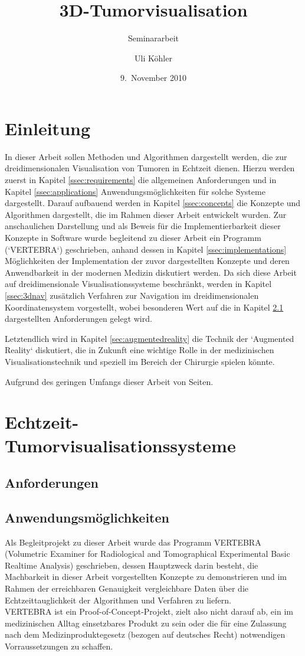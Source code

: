 \documentclass[a4paper]{scrartcl}
\title{3D-Tumorvisualisation}
\subtitle{Seminararbeit}
\author{Uli Köhler}
\date{9.~November 2010}
\begin{document}
\maketitle
\tableofcontents \newpage
\section{Einleitung}\label{sec:introduction}
In dieser Arbeit sollen Methoden und Algorithmen dargestellt werden, die zur dreidimensionalen Visualisation von Tumoren in Echtzeit dienen. Hierzu werden zuerst in Kapitel \vref{ssec:requirements} die allgemeinen Anforderungen und in Kapitel \vref{ssec:applications}
Anwendungsmöglichkeiten für solche Systeme dargestellt. Darauf aufbauend werden in Kapitel \vref{ssec:concepts} die Konzepte und Algorithmen dargestellt, die im Rahmen dieser Arbeit entwickelt wurden. Zur anschaulichen Darstellung und als Beweis für die Implementierbarkeit dieser Konzepte in Software wurde begleitend zu dieser Arbeit ein Programm (`VERTEBRA`) geschrieben, anhand dessen in Kapitel \vref{ssec:implementations} Möglichkeiten der Implementation der zuvor dargestellten Konzepte und deren Anwendbarkeit in der modernen Medizin diskutiert werden. Da sich diese Arbeit auf dreidimensionale Visualisationssysteme beschränkt, werden in Kapitel \vref{ssec:3dnav} zusätzlich Verfahren zur Navigation im dreidimensionalen Koordinatensystem vorgestellt, wobei besonderen Wert auf die in Kapitel \ref{ssec:requirements} dargestellten Anforderungen gelegt wird.

Letztendlich wird in Kapitel \vref{sec:augmentedreality} die Technik der `Augmented Reality` diskutiert, die in Zukunft eine wichtige Rolle in der medizinischen Visualisationstechnik und speziell im Bereich der Chirurgie spielen könnte.

Aufgrund des geringen Umfangs dieser Arbeit von \pageref{appendixstart} Seiten.
\section{Echtzeit-Tumorvisualisationssysteme}\label{sec:vissystems}
\subsection{Anforderungen}\label{ssec:requirements}
\subsection{Anwendungsmöglichkeiten}\label{ssec:applications}
Als Begleitprojekt zu dieser Arbeit wurde das Programm VERTEBRA
(Volumetric Examiner for Radiological and Tomographical Experimental Basic Realtime Analysis) geschrieben, dessen Hauptzweck
darin besteht, die Machbarkeit in dieser Arbeit vorgestellten Konzepte zu demonstrieren und im Rahmen der erreichbaren Genauigkeit
vergleichbare Daten über die Echtzeittauglichkeit der Algorithmen und Verfahren zu liefern.\\
VERTEBRA ist ein Proof-of-Concept-Projekt, zielt also nicht darauf ab, ein im medizinischen Alltag einsetzbares Produkt zu sein oder
die für eine Zulassung nach dem Medizinproduktegesetz (bezogen auf deutsches Recht) notwendigen Vorraussetzungen zu schaffen.
\end{document}
